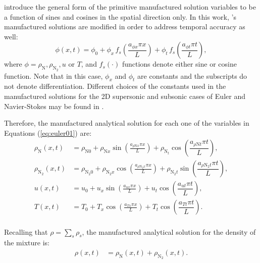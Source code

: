 \documentclass[10pt]{article}
\begin{document}
\citet{Roy2002} introduce the general form of the primitive manufactured solution variables to be  a function of sines and cosines in the spatial direction only. In this work, \citet{Roy2002}'s manufactured solutions are modified in order to address temporal accuracy as well:
\begin{equation}
 \label{eq:manufactured01}
  \phi (x,t) = \phi_0+ \phi_x\, f_s \left(\frac{a_{\phi x} \pi x}{L} \right)+ \phi_t \,f_s\left(\frac{a_{\phi t} \pi t}{L}\right),
\end{equation}
where $\phi=\rho_{\text{N}},\rho_{\text{N}_2},u$ or $T$, and $f_s(\cdot)$ functions denote either sine or cosine function. Note that in this case, $\phi_x$ and $\phi_t$ are constants  and the subscripts do not denote differentiation.
 Different choices of the constants used in the manufactured solutions for the 2D supersonic and subsonic cases of Euler and Navier-Stokes may be found in \citet{Roy2002}.

Therefore, the manufactured analytical solution for each one of the variables in Equations (\ref{eq:euler01}) are:
\begin{equation}
\begin{split}
\label{eq:manufactured02}
\rho_{\text{N}}(x,t) &= \rho_{\text{N}0} + \rho_{\text{N}x} \sin\left(\frac{a_{  \rho \text{N} x }\pi x}{L}\right)+\rho_{\text{N}_t} \cos\left( \dfrac{ a_{ \rho \text{N} t}  \pi t}{L}\right),\\
\rho_{\text{N}_2}(x,t) &= \rho_{\text{N}_2 0}+ \rho_{\text{N}_2 x} \cos\left(\frac{a_{ \rho \text{N}_2 x } \pi x}{L}\right)+\rho_{\text{N}_2 t} \sin\left( \dfrac{ a_{ \rho \text{N}_2 t}\pi t}{L}\right),\\
u(x,t) &= u_{0}+u_{x} \sin\left(\frac{a_{u x} \pi x}{L}\right)+ u_t \cos\left( \dfrac{ a_{ut}\pi t}{L}\right),\\
T(x,t) &= T_{0}+T_{x} \cos\left(\frac{a_{T x} \pi x}{L}\right)+ T_t \cos\left( \dfrac{ a_{Tt} \pi t}{L}\right).\\
\end{split}
\end{equation}

Recalling that $\rho=\sum_s \rho_s$, the manufactured analytical solution for the density of the mixture  is:
\begin{equation}
\label{eq:manufactured03}
\begin{split}
\rho(x,t) &= \rho_{\text{N}}(x,t)+\rho_{\text{N}_2}(x,t).%
\end{split}
\end{equation}
\end{document}
